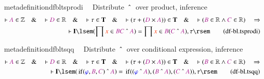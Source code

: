 \begin{restatable}{metadefinition}{dfbltsprodi}~~ Distribute $~\string^~$ over
product, inference
\begin{align}
\vdash \mc{A} \in \mathbb{Z}\quad\&\quad \vdash \mc{D} \in
    \mathbb{R}\quad\&\quad \vdash \tau \in \mathbf{T}\quad\&\quad \vdash ( \tau
    + ( \mc{D} \times \mc{A} ) ) \in \mathbf{T}\quad\&\quad \vdash ( \mc{B} \in
    \mathbb{R} \wedge \mc{C} \in \mathbb{R} )\quad\Rightarrow \notag \\
    \quad \vdash
    \mathbf{I} \lsem ( \prod \msc{x} \in \mc{B} \mc{C} ~\string^~ \mc{A} ) =
    \prod \msc{x} \in \mc{B} ( \mc{C} ~\string^~ \mc{A} ) , \tau
    \rsem\label{eq:df-bl.tsprodi}\tag{df-bl.tsprodi}
\end{align}
\end{restatable}

\begin{restatable}{metadefinition}{dfbltsqq}~~ Distribute $~\string^~$ over
conditional expression, inference
\begin{align}
\vdash \mc{A} \in \mathbb{Z}\quad\&\quad \vdash \mc{D} \in
    \mathbb{R}\quad\&\quad \vdash \tau \in \mathbf{T}\quad\&\quad \vdash ( \tau
    + ( \mc{D} \times \mc{A} ) ) \in \mathbf{T}\quad\&\quad \vdash ( \mc{B} \in
    \mathbb{R} \wedge \mc{C} \in \mathbb{R} )\quad\Rightarrow \notag \\
    \quad \vdash
    \mathbf{I} \lsem ( \,\mathrm{if} ( \mw{\varphi} , \mc{B} , \mc{C} )
    ~\string^~ \mc{A} ) = \,\mathrm{if} ( ( \mw{\varphi} ~\string^~ \mc{A} ) ,
    ( \mc{B} ~\string^~ \mc{A} ) , ( \mc{C} ~\string^~ \mc{A} ) ) , \tau
    \rsem\label{eq:df-bl.tsqq}\tag{df-bl.tsqq}
\end{align}
\end{restatable}

